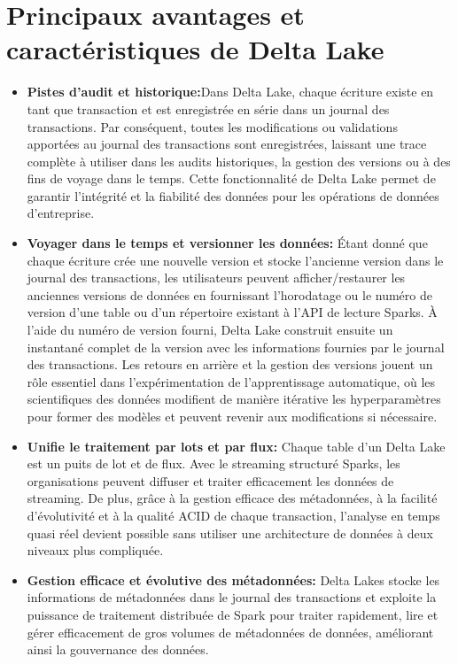 \section{Principaux avantages et caractéristiques de Delta Lake}
\begin{itemize}
    \item[\textbullet] \textbf{Pistes d'audit et historique:}Dans Delta Lake, chaque écriture existe en tant que transaction et est enregistrée en série dans un journal des transactions. Par conséquent, toutes les modifications ou validations apportées au journal des transactions sont enregistrées, laissant une trace complète à utiliser dans les audits historiques, la gestion des versions ou à des fins de voyage dans le temps. Cette fonctionnalité de Delta Lake permet de garantir l'intégrité et la fiabilité des données pour les opérations de données d'entreprise.
    \item[\textbullet] \textbf{Voyager dans le temps et versionner les données:} Étant donné que chaque écriture crée une nouvelle version et stocke l'ancienne version dans le journal des transactions, les utilisateurs peuvent afficher/restaurer les anciennes versions de données en fournissant l'horodatage ou le numéro de version d'une table ou d'un répertoire existant à l'API de lecture Sparks\@. À l'aide du numéro de version fourni, Delta Lake construit ensuite un instantané complet de la version avec les informations fournies par le journal des transactions. Les retours en arrière et la gestion des versions jouent un rôle essentiel dans l'expérimentation de l'apprentissage automatique, où les scientifiques des données modifient de manière itérative les hyperparamètres pour former des modèles et peuvent revenir aux modifications si nécessaire.
    \item[\textbullet] \textbf{Unifie le traitement par lots et par flux:} Chaque table d'un Delta Lake est un puits de lot et de flux. Avec le streaming structuré Sparks, les organisations peuvent diffuser et traiter efficacement les données de streaming. De plus, grâce à la gestion efficace des métadonnées, à la facilité d'évolutivité et à la qualité ACID de chaque transaction, l'analyse en temps quasi réel devient possible sans utiliser une architecture de données à deux niveaux plus compliquée.
    \item[\textbullet] \textbf{Gestion efficace et évolutive des métadonnées:} Delta Lakes stocke les informations de métadonnées dans le journal des transactions et exploite la puissance de traitement distribuée de Spark pour traiter rapidement, lire et gérer efficacement de gros volumes de métadonnées de données, améliorant ainsi la gouvernance des données.

\end{itemize}
